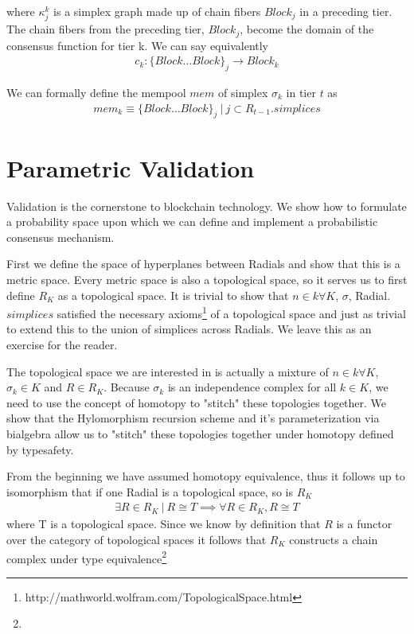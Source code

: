 \documentclass{article}
\begin{document}
where $\kappa_j^{k}$ is a simplex graph made up of chain fibers $Block_j$ in a preceding tier. The chain fibers from the preceding tier, $Block_j$, become the domain of the consensus function for tier k. We can say equivalently
\begin{equation} \label{eq1}
\begin{split}
c_k: \{Block \dots Block\}_j \rightarrow Block_k
\end{split}
\end{equation}

We can formally define the mempool $mem$ of simplex $\sigma_k$ in tier $t$ as 
\begin{equation} \label{eq1}
\begin{split}
mem_k \equiv \{Block \dots Block\}_j \ | \ j \subset R_{t-1}.simplices
\end{split}
\end{equation}

\section{Parametric Validation}
Validation is the cornerstone to blockchain technology. We show how to formulate a probability space upon which we can define and implement a probabilistic consensus mechanism.

First we define the space of hyperplanes between Radials and show that this is a metric space. Every metric space is also a topological space, so it serves us to first define $R_K$ as a topological space. It is trivial to show that $n \in k \forall K$, $\sigma$, Radial.$simplices$ satisfied the necessary axioms\footnote{http://mathworld.wolfram.com/TopologicalSpace.html} of a topological space and just as trivial to extend this to the union of simplices across Radials. We leave this as an exercise for the reader. 

The topological space we are interested in is actually a mixture of $n \in k \forall K$, $\sigma_k \in K$ and $R \in R_K$. Because $\sigma_k$ is an independence complex for all $k \in K$, we need to use the concept of homotopy to "stitch" these topologies together. We show that the Hylomorphism recursion scheme and it's parameterization via bialgebra allow us to "stitch" these topologies together under homotopy defined by typesafety.

From the beginning we have assumed homotopy equivalence, thus it follows up to isomorphism that if one Radial is a topological space, so is $R_K$
\begin{equation} \label{eq1}
\begin{split}
\exists R \in R_K \ | \ R \cong T \implies \forall R \in R_K,  R \cong T
\end{split}
\end{equation}
where T is a topological space. Since we know by definition that $R$ is a functor over the category of topological spaces it follows that $R_K$ constructs a chain complex under type equivalence\footnote{}
\end{document}
